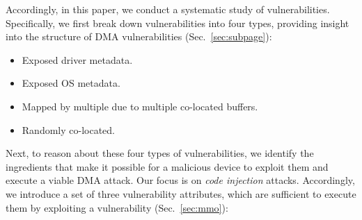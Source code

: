 
Accordingly, in this paper, we conduct a systematic study of \subpage{} vulnerabilities. Specifically, we first break down \subpage{} vulnerabilities into four types, providing insight into the structure of DMA vulnerabilities (Sec.~\ref{sec:subpage}):
\begin{itemize}
    \item Exposed driver metadata.
    \item Exposed OS metadata. 
    \item Mapped by multiple \iova due to multiple co-located buffers.
    \item Randomly co-located.
\end{itemize}


Next, to reason about these four types of \subpage{} vulnerabilities, we identify the ingredients that make it possible for a malicious device to exploit them and execute a viable DMA attack.
Our focus is on \emph{code injection} attacks. Accordingly, we introduce a set of three vulnerability attributes, which are sufficient to execute them by exploiting a \subpage{} vulnerability (Sec.~\ref{sec:mmo}):

